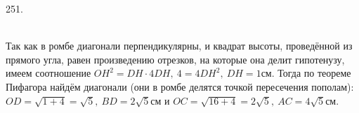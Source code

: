 251. \begin{figure}[ht!]
\end{figure}\\
Так как в ромбе диагонали перпендикулярны, и квадрат высоты, проведённой из прямого угла, равен произведению отрезков, на которые она делит гипотенузу, имеем соотношение $OH^2=DH\cdot4DH,\ 4=4DH^2,\ DH=1$см. Тогда по теореме Пифагора найдём диагонали (они в ромбе делятся точкой пересечения пополам):
$OD=\sqrt{1+4}=\sqrt{5},\ BD=2\sqrt{5}$см и $OC=\sqrt{16+4}=2\sqrt{5},\ AC=4\sqrt{5}$см.\\
